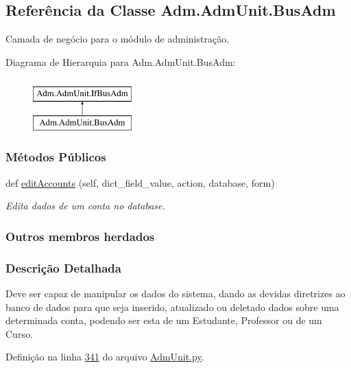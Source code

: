 \hypertarget{classAdm_1_1AdmUnit_1_1BusAdm}{}\subsection{Referência da Classe Adm.\+Adm\+Unit.\+Bus\+Adm}
\label{classAdm_1_1AdmUnit_1_1BusAdm}


Camada de negócio para o módulo de administração.  


Diagrama de Hierarquia para Adm.\+Adm\+Unit.\+Bus\+Adm\+:\begin{figure}[H]
\begin{center}
\leavevmode
\includegraphics[height=2.000000cm]{de/de0/classAdm_1_1AdmUnit_1_1BusAdm}
\end{center}
\end{figure}
\subsubsection*{Métodos Públicos}
\begin{DoxyCompactItemize}
\item 
def \hyperlink{classAdm_1_1AdmUnit_1_1BusAdm_a54984f999b27cdce51914ed05cd7cb42}{edit\+Accounts} (self, dict\+\_\+field\+\_\+value, action, database, form)
\begin{DoxyCompactList}\small\item\em Edita dados de um conta no database. \end{DoxyCompactList}\end{DoxyCompactItemize}
\subsubsection*{Outros membros herdados}


\subsubsection{Descrição Detalhada}
Deve ser capaz de manipular os dados do sistema, dando as devidas diretrizes ao banco de dados para que seja inserido, atualizado ou deletado dados sobre uma determinada conta, podendo ser esta de um Estudante, Professor ou de um Curso. 

Definição na linha \hyperlink{AdmUnit_8py_source_l00341}{341} do arquivo \hyperlink{AdmUnit_8py_source}{Adm\+Unit.\+py}.



